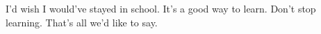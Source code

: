 \documentclass{article}
\begin{document}
I'd wish I would've stayed in school. 
It's a good way to learn. 
Don't stop learning. 
That's all we'd like to say. 
\end{document}
